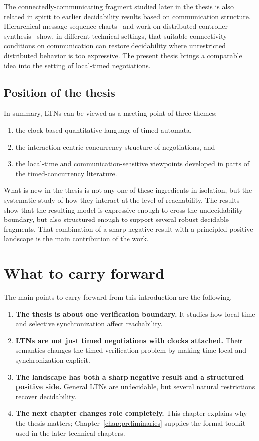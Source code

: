 The connectedly-communicating fragment studied later in the thesis is also related in spirit to earlier decidability results based on communication structure. Hierarchical message sequence charts~\cite{HenriksenMSG} and work on distributed controller synthesis~\cite{PnueliRosner} show, in different technical settings, that suitable connectivity conditions on communication can restore decidability where unrestricted distributed behavior is too expressive. The present thesis brings a comparable idea into the setting of local-timed negotiations.

\subsection{Position of the thesis}

In summary, LTNs can be viewed as a meeting point of three themes:
\begin{enumerate}
    \item the clock-based quantitative language of timed automata,
    \item the interaction-centric concurrency structure of negotiations, and
    \item the local-time and communication-sensitive viewpoints developed in parts of the timed-concurrency literature.
\end{enumerate}
What is new in the thesis is not any one of these ingredients in isolation, but the systematic study of how they interact at the level of reachability. The results show that the resulting model is expressive enough to cross the undecidability boundary, but also structured enough to support several robust decidable fragments. That combination of a sharp negative result with a principled positive landscape is the main contribution of the work.



\section{What to carry forward}
\label{sec:intro-takeaway}

The main points to carry forward from this introduction are the following.
\begin{enumerate}
    \item \textbf{The thesis is about one verification boundary.} It studies how local time and selective synchronization affect reachability.
    \item \textbf{LTNs are not just timed negotiations with clocks attached.} Their semantics changes the timed verification problem by making time local and synchronization explicit.
    \item \textbf{The landscape has both a sharp negative result and a structured positive side.} General LTNs are undecidable, but several natural restrictions recover decidability.
    \item \textbf{The next chapter changes role completely.} This chapter explains why the thesis matters; Chapter~\ref{chap:preliminaries} supplies the formal toolkit used in the later technical chapters.
\end{enumerate}

